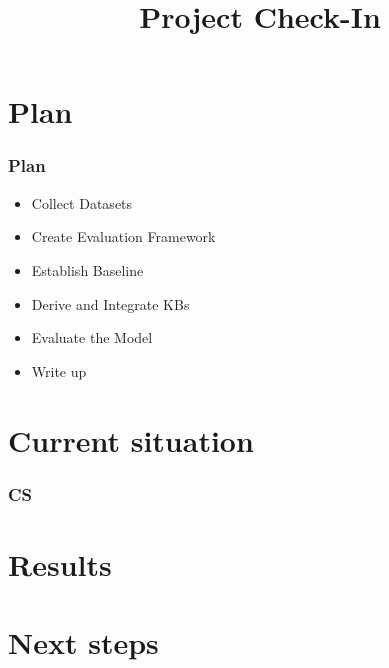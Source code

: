 \documentclass{beamer}
\title{Project Check-In}
\begin{document}
\begin{frame}
\titlepage
\end{frame}

\begin{frame}
	\tableofcontents
\end{frame}

\section{Plan}
\begin{frame}
\frametitle{Plan}

\begin{itemize}
    \item Collect Datasets
    \item Create Evaluation Framework
    \item Establish Baseline
    \item Derive and Integrate KBs
    \item Evaluate the Model
    \item Write up
\end{itemize}

\end{frame}

\section{Current situation}
\begin{frame}
\frametitle{CS}
\end{frame}

\section{Results}
\begin{frame}
\end{frame}

\section{Next steps}
\begin{frame}
\end{frame}
\end{document}
